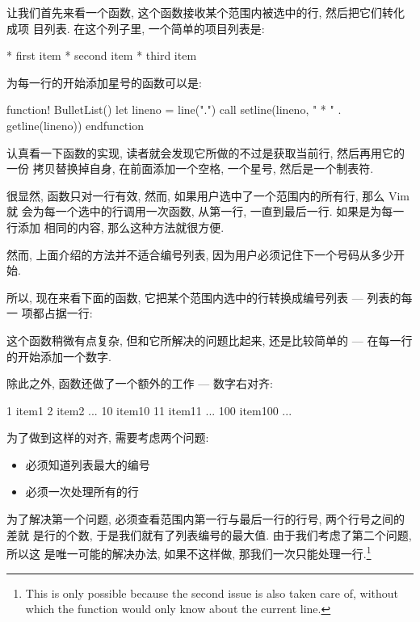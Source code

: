让我们首先来看一个函数, 这个函数接收某个范围内被选中的行, 然后把它们转化成项
目列表. 在这个列子里, 一个简单的项目列表是:
\begin{vimcode}
* first item
* second item
* third item
\end{vimcode}
为每一行的开始添加星号的函数可以是:
\begin{vimcode}
function! BulletList()
    let lineno = line(".")
    call setline(lineno, "    * " . getline(lineno))
endfunction
\end{vimcode}

认真看一下函数的实现, 读者就会发现它所做的不过是获取当前行, 然后再用它的一份
拷贝替换掉自身, 在前面添加一个空格, 一个星号, 然后是一个制表符.

很显然, 函数只对一行有效, 然而, 如果用户选中了一个范围内的所有行, 那么 Vim 就
会为每一个选中的行调用一次函数, 从第一行, 一直到最后一行. 如果是为每一行添加
相同的内容, 那么这种方法就很方便.

然而, 上面介绍的方法并不适合编号列表, 因为用户必须记住下一个号码从多少开始.

所以, 现在来看下面的函数, 它把某个范围内选中的行转换成编号列表 --- 列表的每一
项都占据一行:

这个函数稍微有点复杂, 但和它所解决的问题比起来, 还是比较简单的 --- 在每一行
的开始添加一个数字.

除此之外, 函数还做了一个额外的工作 --- 数字右对齐:
\begin{vimcode}
    1 item1
    2 item2
    ...
   10 item10
   11 item11
    ...
  100 item100
    ...
\end{vimcode}

为了做到这样的对齐, 需要考虑两个问题:
\begin{itemize}
    \item 必须知道列表最大的编号
    \item 必须一次处理所有的行
\end{itemize}

为了解决第一个问题, 必须查看范围内第一行与最后一行的行号, 两个行号之间的差就
是行的个数, 于是我们就有了列表编号的最大值. 由于我们考虑了第二个问题, 所以这
是唯一可能的解决办法, 如果不这样做, 那我们一次只能处理一行.\footnote{This is
only possible because the second issue is also taken care of, without which
the function would only know about the current line.}

